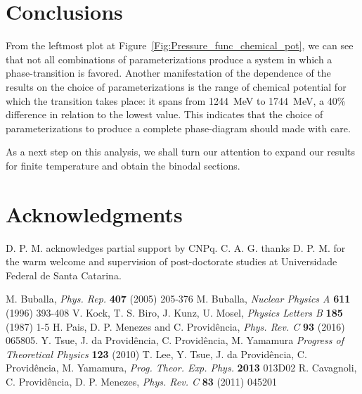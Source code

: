 \documentclass{ws-ijmpcs}
\begin{document}
\section{Conclusions}

From the leftmost plot at Figure~\ref{Fig:Pressure_func_chemical_pot}, we can see that not all combinations of parameterizations produce a system in which a phase-transition is favored. Another manifestation of the dependence of the results on the choice of parameterizations is the range of chemical potential for which the transition takes place: it spans from 1244~MeV to 1744~MeV, a 40\% difference in relation to the lowest value. This indicates that the choice of parameterizations to produce a complete phase-diagram should made with care.

As a next step on this analysis, we shall turn our attention to expand our results for finite temperature and obtain the binodal sections.

\section*{Acknowledgments}

D. P. M. acknowledges partial support by CNPq. C. A. G. thanks D. P. M. for the warm welcome and supervision of post-doctorate studies at Universidade Federal de Santa Catarina.


\begin{thebibliography}{00}

 M. Buballa, {\it Phys. Rep.} {\bf 407} (2005) 205-376
 M. Buballa, {\it Nuclear Physics A} {\bf 611} (1996) 393-408
 V. Kock, T. S. Biro, J. Kunz, U. Mosel, {\it Physics Letters B} {\bf 185} (1987) 1-5
 H. Pais, D. P. Menezes and C. Providência, {\it Phys. Rev. C} {\bf 93} (2016) 065805.
 Y. Tsue, J. da Provid{\^e}ncia, C. Provid{\^e}ncia, M. Yamamura {\it Progress of Theoretical Physics} {\bf 123} (2010)
 T. Lee, Y. Tsue, J. da Provid{\^e}ncia, C. Provid{\^e}ncia, M. Yamamura, {\it Prog. Theor. Exp. Phys.} {\bf 2013} 013D02
 R. Cavagnoli, C. Provid{\^e}ncia, D. P. Menezes, {\it Phys. Rev. C} {\bf 83} (2011) 045201

\end{thebibliography}
\end{document}
